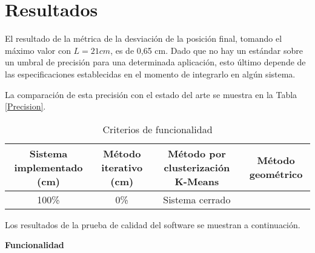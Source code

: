 \section{Resultados}

El resultado de la métrica de la desviación de la posición final, tomando el máximo valor con $L = 21 cm$, es de 0,65 cm. Dado que no hay un estándar sobre un umbral de precisión para una determinada aplicación, esto último depende de las especificaciones establecidas en el momento de integrarlo en algún sistema.

La comparación de esta precisión con el estado del arte se muestra en la Tabla \ref{Precision}.

\begin{table}[ht]
	\centering
	\begin{tabular}{|c|c|c|c|}
		\hline
		\textbf{Sistema implementado (cm)} & \textbf{Método iterativo (cm)} & \textbf{Método por clusterización K-Means} & \textbf{Método geométrico} \\
		\hline
		100\% & 0\% & Sistema cerrado \\
		\hline
	\end{tabular}
	\caption{Criterios de funcionalidad}
	\label{tab:Precision}
\end{table}

Los resultados de la prueba de calidad del software se muestran a continuación.

\textbf{Funcionalidad}

